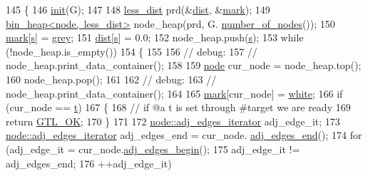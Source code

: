 \begin{DoxyCode}
145 \{
146     \mbox{\hyperlink{classdijkstra_a6dafb552780e09a56b87e2a33a98e74b}{init}}(G);
147 
148     \mbox{\hyperlink{classless__dist}{less\_dist}} prd(&\mbox{\hyperlink{classdijkstra_a154cafdd5511db8f61770348ef117cda}{dist}}, &\mbox{\hyperlink{classdijkstra_a407f98e26ca2cfb8c9ddecf4f8babdcc}{mark}});
149     \mbox{\hyperlink{classbin__heap}{bin\_heap<node, less\_dist>}} node\_heap(prd, G.
      \mbox{\hyperlink{classgraph_a42c78e0a9f115655e3ff0efe35ebfc4e}{number\_of\_nodes}}());
150     \mbox{\hyperlink{classdijkstra_a407f98e26ca2cfb8c9ddecf4f8babdcc}{mark}}[\mbox{\hyperlink{classdijkstra_a721bfb648626a1be2b9d276d85ebdb9d}{s}}] = \mbox{\hyperlink{classdijkstra_a2bdd8d3b57860b5715d01e65664e810fa6c55d71322cdf1f158dc5e1e0c239427}{grey}};
151     \mbox{\hyperlink{classdijkstra_a154cafdd5511db8f61770348ef117cda}{dist}}[\mbox{\hyperlink{classdijkstra_a721bfb648626a1be2b9d276d85ebdb9d}{s}}] = 0.0;
152     node\_heap.push(\mbox{\hyperlink{classdijkstra_a721bfb648626a1be2b9d276d85ebdb9d}{s}});
153     \textcolor{keywordflow}{while} (!node\_heap.is\_empty())
154     \{
155 
156     \textcolor{comment}{// debug:}
157     \textcolor{comment}{// node\_heap.print\_data\_container();}
158 
159     \mbox{\hyperlink{classnode}{node}} cur\_node = node\_heap.top();
160     node\_heap.pop();
161 
162     \textcolor{comment}{// debug:}
163     \textcolor{comment}{// node\_heap.print\_data\_container();}
164 
165     \mbox{\hyperlink{classdijkstra_a407f98e26ca2cfb8c9ddecf4f8babdcc}{mark}}[cur\_node] = \mbox{\hyperlink{classdijkstra_a2bdd8d3b57860b5715d01e65664e810faad3592711b48819ad438e34c2bb1fb2d}{white}};
166     \textcolor{keywordflow}{if} (cur\_node == \mbox{\hyperlink{classdijkstra_a6c42e614aabfbef25b5acfb543fbe1d1}{t}})
167     \{
168         \textcolor{comment}{// if @a t is set through #target we are ready}
169         \textcolor{keywordflow}{return} \mbox{\hyperlink{classalgorithm_af1a0078e153aa99c24f9bdf0d97f6710a5114c20e4a96a76b5de9f28bf15e282b}{GTL\_OK}};
170     \}
171 
172     \mbox{\hyperlink{classnode_a12cb1a2167f5f03c054de5e707d3156f}{node::adj\_edges\_iterator}} adj\_edge\_it;
173     \mbox{\hyperlink{classnode_a12cb1a2167f5f03c054de5e707d3156f}{node::adj\_edges\_iterator}} adj\_edges\_end = cur\_node.
      \mbox{\hyperlink{classnode_aa1e7887d29390297580769454f769ad6}{adj\_edges\_end}}();
174     \textcolor{keywordflow}{for} (adj\_edge\_it = cur\_node.\mbox{\hyperlink{classnode_a788d3e932a5c164caa5ec82aa47551b2}{adj\_edges\_begin}}();
175          adj\_edge\_it != adj\_edges\_end;
176          ++adj\_edge\_it)

\end{DoxyCode}
